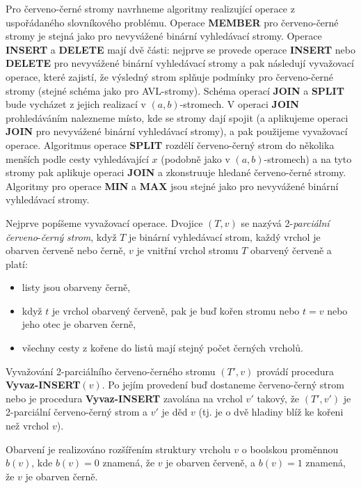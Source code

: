 \documentclass[a4paper,12pt]{article}
\begin{document}
Pro červeno-černé stromy navrhneme algoritmy 
realizující ope\-race z uspořádaného slovní\-ko\-vého problému.  
Operace {\bf MEMBER} pro červeno-černé stromy je stejná jako pro 
nevyvážené binární vyhledávací stromy. Operace 
{\bf IN\-SERT} a {\bf DELETE} mají dvě části:  nejprve se provede 
ope\-race {\bf INSERT} nebo {\bf DELETE} pro nevyvážené binární 
vy\-hledávací stromy a pak následují vyvažovací operace, které 
zajistí, že výsledný strom splňuje pod\-mín\-ky pro červeno-černé 
stromy (stejné schéma jako pro AVL-stromy). Schéma operací 
{\bf JOIN} a {\bf SPLIT} bude vycházet z jejich realizací v $
(a,b)$-stromech. 
V operaci {\bf JOIN} prohledáváním nalezneme místo, kde se 
stromy  
dají spojit (a aplikujeme operaci {\bf JOIN} pro 
nevyvážené 
binární vyhledá\-va\-cí stromy), a pak použijeme 
vyvažovací operace. Algoritmus ope\-race {\bf SPLIT} rozdělí červeno-černý strom 
do několika menších podle cesty vyhledávající $
x$ (podobně jako 
v $(a,b)$-stromech) a na tyto stromy pak aplikuje operaci {\bf JOIN }
a zkonstruuje hledané červeno-černé stromy. Algoritmy pro 
ope\-race {\bf MIN} a {\bf MAX} jsou stejné jako pro nevyvážené binární 
vyhledávací stromy.

Nejprve popíšeme vyvažovací operace. 
Dvojice $(T,v)$ se nazývá 2-\emph{parciální}
\emph{červeno}-\emph{černý} \emph{strom}, když $T$ je 
binární vyhledávací strom, každý vrchol je obarven 
červeně nebo černě, $v$ je 
vnitřní vrchol stromu $T$ obarvený červeně a platí:
\begin{itemize}
\item
listy jsou obarveny černě,
\item
když $t$ je vrchol obarvený červeně, pak je buď kořen 
stromu nebo $t=v$ nebo jeho otec je obarven černě,
\item
všechny cesty z kořene do listů mají stejný 
počet čer\-ných vrcholů.
\end{itemize}

Vyvažování 2-parciálního červeno-černého stromu $(T',v)$ 
pro\-vá\-dí procedura {\bf Vyvaz-IN\-SERT$(v)$}.  Po jejím 
provedení buď do\-sta\-neme čer\-ve\-no-černý strom nebo 
je procedura {\bf Vyvaz-IN\-SERT} zavolána na vrchol $
v'$ takový, 
že $(T',v')$ je 2-parciální červe\-no-černý strom a $
v'$ je děd $v$ 
(tj.  je o dvě hladiny blíž ke kořeni než vrchol $
v$). 

Obarvení je realizováno rozšířením struktury vrcholu $v$ 
o boolskou proměnnou $b(v)$, kde $b(v)=0$ znamená, že $v$ je obarven 
červeně, a $b(v)=1$ znamená, že $v$ je obarven černě.
\end{document}

